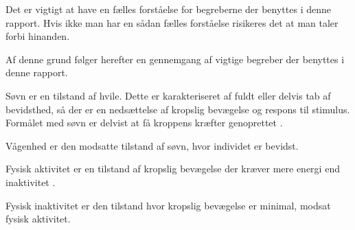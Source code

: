 Det er vigtigt at have en fælles forståelse for begreberne der benyttes i denne rapport.
Hvis ikke man har en sådan fælles forståelse risikeres det at man taler forbi hinanden.

Af denne grund følger herefter en gennemgang af vigtige begreber der benyttes i denne rapport.

\begin{description}[style=nextline]
	\item[Søvn] Søvn er en tilstand af hvile. Dette er karakteriseret af fuldt eller delvis tab af bevidsthed, så der er en nedsættelse af kropslig bevægelse og respons til stimulus. Formålet med søvn er delvist at få kroppens kræfter genoprettet \citep{misc:SleepDefinition}.
	\item[Vågenhed] Vågenhed er den modsatte tilstand af søvn, hvor individet er bevidst.
	\item[Fysisk aktivitet] Fysisk aktivitet er en tilstand af kropslig bevægelse der kræver mere energi end inaktivitet \citep{misc:PhysicalActivity}.
	\item[Fysisk inaktivitet] Fysisk inaktivitet er den tilstand hvor kropslig bevægelse er minimal, modsat fysisk aktivitet.
\end{description}
